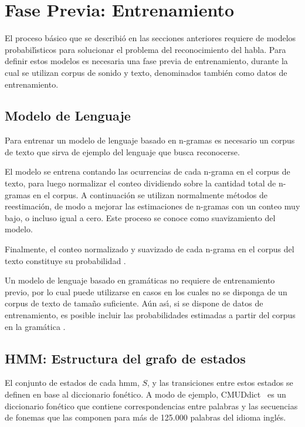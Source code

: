 \section{Fase Previa: Entrenamiento}
\label{sec:training}

El proceso b\'asico que se describi\'o en las secciones anteriores requiere de modelos probabil{\'\i}sticos para
solucionar el problema del reconocimiento del habla. Para definir estos modelos es necesaria una
fase previa de entrenamiento, durante la cual se utilizan corpus de sonido y texto, denominados tambi\'en
como datos de entrenamiento.

\subsection{Modelo de Lenguaje}

Para entrenar un modelo de lenguaje basado en n-gramas es necesario un corpus de texto que 
sirva de ejemplo del lenguaje que busca reconocerse.

El modelo se entrena contando las ocurrencias de cada n-grama en el corpus de texto, para luego
normalizar el conteo dividiendo sobre la cantidad total de n-gramas en el corpus.
A continuaci\'on se utilizan normalmente m\'etodos de reestimaci\'on, de modo a mejorar las estimaciones 
de n-gramas con un conteo muy bajo, o incluso igual a cero. Este proceso se conoce como suavizamiento
del modelo.

Finalmente, el conteo normalizado y suavizado de cada n-grama en el corpus del texto constituye su
probabilidad \cite{CollinsLanguage}.

Un modelo de lenguaje basado en gram\'aticas no requiere de entrenamiento previo, por lo cual puede
utilizarse en casos en los cuales no se disponga de un corpus de texto de tama\~no suficiente.
A\'un as{\'\i}, si se dispone de datos de entrenamiento, es posible incluir las probabilidades estimadas
a partir del corpus en la gram\'atica \cite{huang-handbook10}.

\subsection{HMM: Estructura del grafo de estados}
El conjunto de estados de cada \gls{hmm}, $S$, y las transiciones entre estos estados se definen en base
al diccionario fon\'etico. A modo de ejemplo, \mbox{CMUDdict \cite{CMUdict}} es un diccionario fon\'etico
que contiene correspondencias entre palabras y las secuencias de fonemas que las componen para m\'as de
125.000 palabras del idioma ingl\'es.


